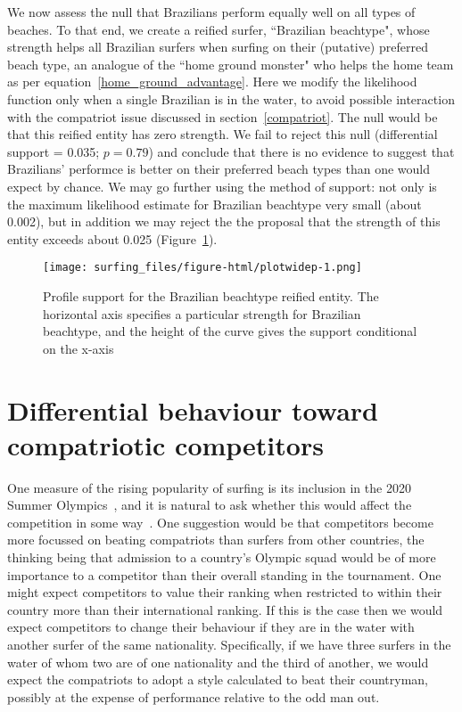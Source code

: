 \documentclass{article}
\begin{document}
We now assess the null that
Brazilians perform equally well on all types of beaches.  To that end,
we create a reified surfer, ``Brazilian beachtype", whose strength
helps all Brazilian surfers when surfing on their (putative) preferred
beach type, an analogue of the ``home ground monster" who helps the
home team as per equation~\ref{home_ground_advantage}.  Here we modify
the likelihood function only when a single Brazilian is in the water,
to avoid possible interaction with the compatriot issue discussed in
section~\ref{compatriot}.  The null would be that this reified entity
has zero strength.  We fail to reject this null (differential support
= 0.035; $p=0.79$) and conclude that there is no evidence to suggest
that Brazilians' performce is better on their preferred beach types
than one would expect by chance.  We may go further using the method
of support: not only is the maximum likelihood estimate for Brazilian
beachtype very small (about 0.002), but in addition we may reject the
the proposal that the strength of this entity exceeds about 0.025
(Figure~\ref{brazilian_beachtype_support}).

\begin{figure}
  \texttt{[image: surfing\_files/figure-html/plotwidep-1.png]}
\caption{Profile support \label{brazilian_beachtype_support} for the
  Brazilian beachtype reified entity.  The horizontal axis specifies a
  particular strength for Brazilian beachtype, and the height of the
  curve gives the support conditional on the x-axis}
\end{figure}

\section{Differential \label{compatriot} behaviour toward compatriotic competitors}

One measure of the rising popularity of surfing is its inclusion in
the 2020 Summer Olympics~\cite{tulloch2019}, and it is natural to ask
whether this would affect the competition in some way~\cite{ho2021}.
One suggestion would be that competitors become more focussed on
beating compatriots than surfers from other countries, the thinking
being that admission to a country's Olympic squad would be of more
importance to a competitor than their overall standing in the
tournament.  One might expect competitors to value their ranking when
restricted to within their country more than their international
ranking.  If this is the case then we would expect competitors to
change their behaviour if they are in the water with another surfer of
the same nationality.  Specifically, if we have three surfers in the
water of whom two are of one nationality and the third of another, we
would expect the compatriots to adopt a style calculated to beat their
countryman, possibly at the expense of performance relative to the odd
man out.
\end{document}
